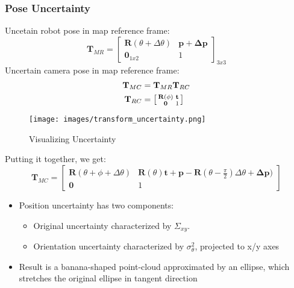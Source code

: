 \subsubsection{Pose Uncertainty}
Uncetain robot pose in map reference frame:
\begin{equation}
  \mathbf{T}_{MR} = \begin{bmatrix} \mathbf{R}(\theta + \Delta \theta) & \mathbf{p}+\mathbf{\Delta p} \\ \mathbf{0}_{1x2} & 1 \end{bmatrix}_{3x3}
\end{equation}
Uncertain camera pose in map reference frame:
\begin{align}
  \mathbf{T}_{MC} &= \mathbf{T}_{MR} \mathbf{T}_{RC} \\
  \mathbf{T}_{RC} &= \begin{bsmallmatrix} \mathbf{R}(\phi) & \mathbf{t} \\ \mathbf{0} & 1 \end{bsmallmatrix}
\end{align}
\begin{figure}[H]
  \begin{center}
    \texttt{[image: images/transform\_uncertainty.png]}
  \end{center}
  \caption{Visualizing Uncertainty}\label{fig:Visualizing Uncertainty}
\end{figure}

Putting it together, we get:
\begin{equation}
  \mathbf{T}_{MC} = \begin{bmatrix} \mathbf{R}(\theta + \phi + \Delta \theta) & \mathbf{R}(\theta) \mathbf{t} + \mathbf{p} - \mathbf{R}(\theta - \frac{\pi}{2}) \Delta \theta + \mathbf{\Delta p}) \\
                  \mathbf{0} & 1
  \end{bmatrix}
  \label{eq:position uncertainty}
\end{equation}
\begin{itemize}
  \item Position uncertainty has two components:
  \begin{itemize}
    \item Original uncertainty characterized by $\Sigma_{xy}$.
    \item Orientation uncertainty characterized by $\sigma_{\theta}^2$, projected to x/y axes
  \end{itemize}
  \item Result is a banana-shaped point-cloud approximated by an ellipse, which stretches the original ellipse in tangent direction
\end{itemize}

